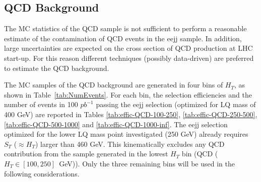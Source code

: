 







\subsection{QCD Background} \label{sec:QCDBackground}

The MC statistics of the QCD sample is not sufficient to perform a reasonable estimate of the contamination 
of QCD events in the eejj sample.
In addition, large uncertainties are expected on the cross section of QCD production at LHC start-up.
For this reason different techniques (possibly data-driven) are preferred to estimate the QCD background.

The MC samples of the QCD background are generated in four bins of $H_T$, as shown in Table~\ref{tab:NumEvents}.
For each bin, the selection efficiencies and the number of events in 100 $pb^{-1}$ passing the eejj selection 
(optimized for LQ mass of 400 GeV) are reported in Tables 
\ref{tab:effic-QCD-100-250},
\ref{tab:effic-QCD-250-500},
\ref{tab:effic-QCD-500-1000} and
\ref{tab:effic-QCD-1000-inf}. 
The eejj selection optimized for the lower LQ mass point investigated (250 GeV) already requires 
$S_{T}$ ($\approx H_T$) larger than 460 GeV. This kinematically excludes any 
QCD contribution from the sample generated in the lowest $H_T$ bin (QCD ($H_T\in[100,250]$~GeV)). 
Only the three remaining bins will be used in the following considerations.


